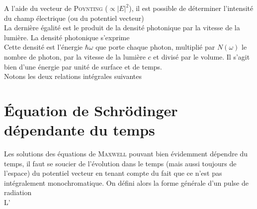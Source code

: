 A l'aide du vecteur de \textsc{Poynting} ($\propto |E|^2$), il est possible de déterminer l'intensité
du champ électrique (ou du potentiel vecteur)
\begin{equation}

\end{equation}
La dernière égalité est le produit de la densité photonique par la vitesse de la lumière. La densité
photonique s'exprime
\begin{equation}

\end{equation}
Cette densité est l'énergie $\hbar\omega$ que porte chaque photon, multiplié par $N(\omega)$ le nombre
de photon, par la vitesse de la lumière $c$ et divisé par le volume. Il s'agit bien d'une énergie par
unité de surface et de temps.
\begin{equation}

\end{equation}
Notons les deux relations intégrales suivantes
\begin{equation}

\end{equation}

\section{Équation de Schrödinger dépendante du temps}
Les solutions des équations de \textsc{Maxwell} pouvant bien évidemment dépendre du temps, il faut se
soucier de l'évolution dans le temps (mais aussi toujours de l'espace) du potentiel vecteur en tenant
compte du fait que ce n'est pas intégralement monochromatique. On défini alors la forme générale d'un
pulse de radiation
\begin{equation}

\end{equation}
L'



\iffalse
intensité = densité photonique * vit lumiere

densité c'est une énergie hbar w que porte chaque photon * N(w) le nombre de photon, * c/ volume : on a une énergie par unité de surface et de temps
\fi